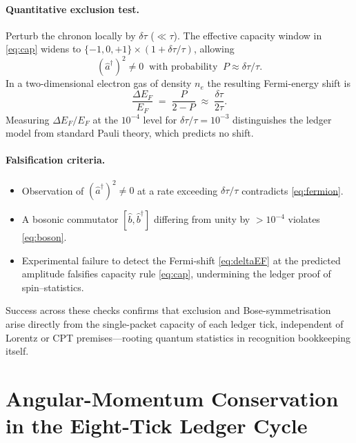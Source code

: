 \documentclass[11pt,oneside]{book}
\begin{document}
\paragraph{Quantitative exclusion test.}
Perturb the chronon locally by $\delta\tau$ ($\ll\tau$).  The effective
capacity window in \eqref{eq:cap} widens to
$
   \{-1,0,+1\}\times(1+\delta\tau/\tau)
$,
allowing
%
\[
   (\hat a^{\dagger})^{2}\neq0
   \;\;\text{with probability}\;\;
   P\approx\delta\tau/\tau .
\]
In a two-dimensional electron gas of density $n_{e}$ the resulting
Fermi-energy shift is
%
\[
   \frac{\Delta E_{F}}{E_{F}}
   \;=\;
   \frac{P}{2-P}
   \;\approx\;
   \frac{\delta\tau}{2\tau}.
   \tag{S–C.4}\label{eq:deltaEF}
\]
Measuring $\Delta E_{F}/E_{F}$ at the $10^{-4}$ level for
$\delta\tau/\tau=10^{-3}$ distinguishes the ledger model from
standard Pauli theory, which predicts no shift.

\paragraph{Falsification criteria.}
%
\begin{itemize}[leftmargin=*,itemsep=3pt]
\item Observation of $(\hat a^{\dagger})^{2}\neq0$ at a rate
      exceeding \(\delta\tau/\tau\) contradicts \eqref{eq:fermion}.
\item A bosonic commutator $[\hat b,\hat b^{\dagger}]$ differing from
      unity by $>10^{-4}$ violates \eqref{eq:boson}.
\item Experimental failure to detect the Fermi-shift
      \eqref{eq:deltaEF} at the predicted amplitude falsifies
      capacity rule \eqref{eq:cap}, undermining the ledger proof of
      spin–statistics.
\end{itemize}

\noindent
Success across these checks confirms that exclusion and
Bose-symmetrisation arise directly from the single-packet capacity of
each ledger tick, independent of Lorentz or CPT premises—rooting
quantum statistics in recognition bookkeeping itself.


\section{Angular-Momentum Conservation in the Eight-Tick Ledger Cycle}
\label{sec:spin-conservation-narrative}
\end{document}

